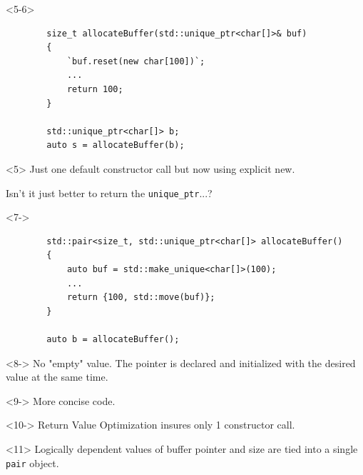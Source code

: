 \documentclass{beamer}
\begin{document}
\begin{frame}[fragile,t]
\begin{onlyenv}
	\end{onlyenv}
	
	\begin{onlyenv}<5-6>
	\begin{lstlisting}
		size_t allocateBuffer(std::unique_ptr<char[]>& buf)
		{
			`buf.reset(new char[100])`;
			...
			return 100;
		}
		
		std::unique_ptr<char[]> b;
		auto s = allocateBuffer(b);
	\end{lstlisting}

	\begin{block}{}<5>
		Just one default constructor call but now using explicit new.
	\end{block}
	{
		Isn't it just better to return the \texttt{unique\_ptr}...?
	}	
	
	\end{onlyenv}
	
	\begin{onlyenv}<7->
	\begin{lstlisting}
		std::pair<size_t, std::unique_ptr<char[]> allocateBuffer()
		{
			auto buf = std::make_unique<char[]>(100);
			...
			return {100, std::move(buf)};
		}
		
		auto b = allocateBuffer();
	\end{lstlisting}

	\begin{block}{}<8->
		No "empty" value. The pointer is declared and initialized with the desired value at the same time.
	\end{block}
	
	\begin{block}{}<9->
		More concise code.
	\end{block}
	
	\begin{block}{}<10->
		Return Value Optimization insures only 1 constructor call.
	\end{block}
	
	\begin{block}{}<11>
		Logically dependent values of buffer pointer and size are tied into a single \texttt{pair} object.
	\end{block}	
	
	\end{onlyenv}			
\end{frame}
\end{document}
